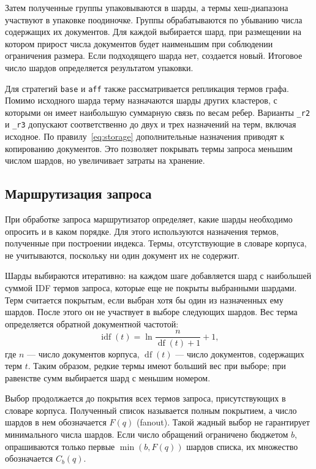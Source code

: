 \documentclass[10pt, a4paper, twoside]{article}
\newcommand{\strategy}[1]{\texttt{#1}}
\begin{document}
\begin{ntvbody}
Затем полученные группы упаковываются в шарды, а термы хеш-диапазона участвуют в упаковке поодиночке.
Группы обрабатываются по убыванию числа содержащих их документов.
Для каждой выбирается шард, при размещении на котором прирост числа документов будет наименьшим при соблюдении ограничения размера.
Если подходящего шарда нет, создается новый.
Итоговое число шардов определяется результатом упаковки.

Для стратегий \strategy{base} и \strategy{aff} также рассматривается репликация термов графа.
Помимо исходного шарда терму назначаются шарды других кластеров, с которыми он имеет наибольшую суммарную связь по весам ребер.
Варианты \strategy{\_r2} и \strategy{\_r3} допускают соответственно до двух и трех назначений на терм, включая исходное.
По правилу~\eqref{eq:storage} дополнительные назначения приводят к копированию документов.
Это позволяет покрывать термы запроса меньшим числом шардов, но увеличивает затраты на хранение.

\subsection{Маршрутизация запроса}
При обработке запроса маршрутизатор определяет, какие шарды необходимо опросить и в каком порядке.
Для этого используются назначения термов, полученные при построении индекса.
Термы, отсутствующие в словаре корпуса, не учитываются, поскольку ни один документ их не содержит.

Шарды выбираются итеративно: на каждом шаге добавляется шард с наибольшей суммой IDF термов запроса, которые еще не покрыты выбранными шардами.
Терм считается покрытым, если выбран хотя бы один из назначенных ему шардов.
После этого он не участвует в выборе следующих шардов.
Вес терма определяется обратной документной частотой:
\begin{equation}
 \operatorname{idf}(t)=\ln\frac{n}{\operatorname{df}(t)+1}+1,
 \label{eq:idf}
\end{equation}
где $n$ --- число документов корпуса, $\operatorname{df}(t)$ --- число документов, содержащих терм $t$.
Таким образом, редкие термы имеют больший вес при выборе; при равенстве сумм выбирается шард с меньшим номером.

Выбор продолжается до покрытия всех термов запроса, присутствующих в словаре корпуса.
Полученный список называется полным покрытием, а число шардов в нем обозначается $F(q)$ (fanout).
Такой жадный выбор не гарантирует минимального числа шардов.
Если число обращений ограничено бюджетом $b$, опрашиваются только первые $\min(b,F(q))$ шардов списка, их множество обозначается $C_b(q)$.


\end{ntvbody}
\end{document}
